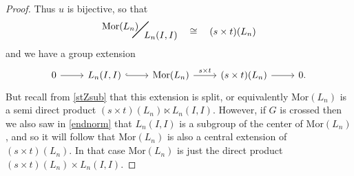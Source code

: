 \documentclass{amsbook} %
\newcommand{\bigquotient}[2]{ \raisebox{0.75\height}{$#1$} \mkern-12mu\scalebox{2}{$\diagup$}\mkern-10mu \raisebox{-0.5\height}{$#2$} }
\numberwithin{section}{chapter}
\begin{document}
\begin{proof}
Thus $u$ is bijective, so that
\[ \bigquotient{\mathrm{Mor}(L_n)}{L_n(I,I)} \quad \cong \quad (s \times t)(L_n) \]
and we have a group extension
\[ \begin{tikzcd}
0 \ar[r] & L_n(I,I) \ar[r, hookrightarrow] & \mathrm{Mor}(L_n) \ar[r, "s \times t"] & (s \times t)(L_n) \ar[r] & 0.
\end{tikzcd} \]
But recall from \cref{stZsub} that this extension is split, or equivalently $\mathrm{Mor}(L_n)$ is a semi direct product $(s \times t)(L_n) \ltimes L_n(I,I)$. However, if $G$ is crossed then we also saw in \cref{endnorm} that $L_n(I,I)$ is a subgroup of the center of $\mathrm{Mor}(L_n)$, and so it will follow that $\mathrm{Mor}(L_n)$ is also a central extension of $(s \times t)(L_n)$. In that case $\mathrm{Mor}(L_n)$ is just the direct product $(s \times t)(L_n) \times L_n(I,I)$.
\end{proof}

%
%
%
\end{document}
